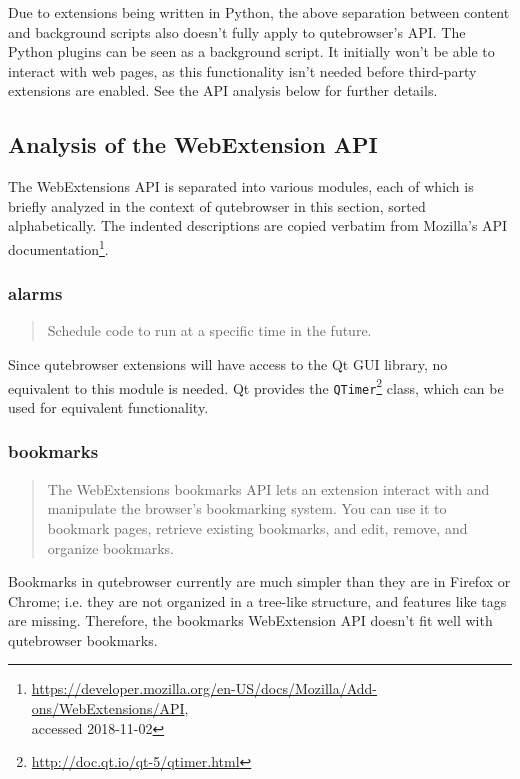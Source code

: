 \documentclass[a4paper,parskip=full]{scrreprt}
\begin{document}
Due to extensions being written in Python, the above separation between content
and background scripts also doesn't fully apply to qutebrowser's API. The Python
plugins can be seen as a background script. It initially won't be able to
interact with web pages, as this functionality isn't needed before third-party
extensions are enabled. See the API analysis below for further details.

\subsection{Analysis of the WebExtension API}

The WebExtensions API is separated into various modules, each of which is
briefly analyzed in the context of qutebrowser in this section, sorted
alphabetically. The indented descriptions are copied verbatim from Mozilla's API
documentation\footnote{\url{https://developer.mozilla.org/en-US/docs/Mozilla/Add-ons/WebExtensions/API},
  \\ accessed 2018-11-02}.

\subsubsection{alarms}
\begin{quote}
Schedule code to run at a specific time in the future.
\end{quote}

Since qutebrowser extensions will have access to the Qt GUI library, no
equivalent to this module is needed. Qt provides the
\verb|QTimer|\footnote{\url{http://doc.qt.io/qt-5/qtimer.html}} class, which can
be used for equivalent functionality.

\subsubsection{bookmarks}
\begin{quote}
The WebExtensions bookmarks API lets an extension interact with and manipulate the browser's bookmarking system. You can use it to bookmark pages, retrieve existing bookmarks, and edit, remove, and organize bookmarks.
\end{quote}

Bookmarks in qutebrowser currently are much simpler than they are in Firefox or
Chrome; i.e. they are not organized in a tree-like structure, and features like
tags are missing. Therefore, the bookmarks WebExtension API doesn't fit well
with qutebrowser bookmarks.
\end{document}
